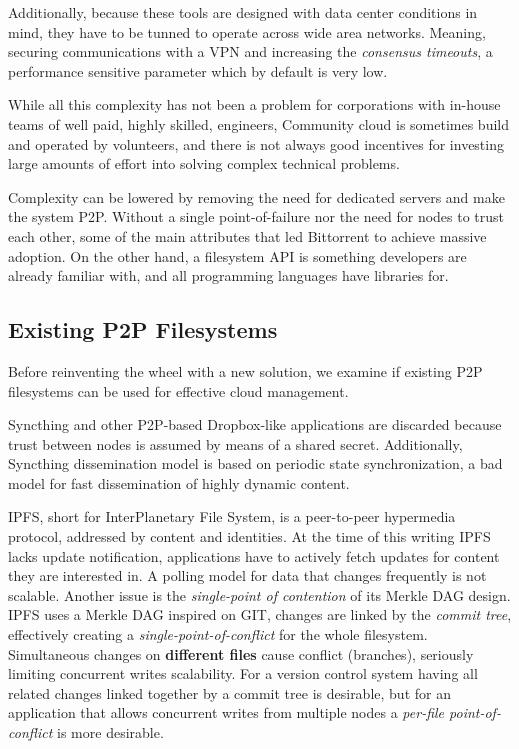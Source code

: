 \documentclass{sig-alternate}
\begin{document}
Additionally, because these tools are designed with data center conditions in mind, they have to be tunned to operate across wide area networks. Meaning, securing communications with a VPN and increasing the \textit{consensus timeouts}, a performance sensitive parameter which by default is very low.

While all this complexity has not been a problem for corporations with in-house teams of well paid, highly skilled, engineers, Community cloud is sometimes build and operated by volunteers, and there is not always good incentives for investing large amounts of effort into solving complex technical problems.

Complexity can be lowered by removing the need for dedicated servers and make the system P2P. Without a single point-of-failure nor the need for nodes to trust each other, some of the main attributes that led Bittorrent to achieve massive adoption. On the other hand, a filesystem API is something developers are already familiar with, and all programming languages have libraries for.

\subsection{Existing P2P Filesystems}

Before reinventing the wheel with a new solution, we examine if existing P2P filesystems can be used for effective cloud management.

Syncthing and other P2P-based Dropbox-like applications are discarded because trust between nodes is assumed by means of a shared secret. Additionally, Syncthing dissemination model is based on periodic state synchronization, a bad model for fast dissemination of highly dynamic content.

IPFS, short for InterPlanetary File System, is a peer-to-peer hypermedia protocol, addressed by content and identities\cite{IPFS}. At the time of this writing IPFS lacks update notification, applications have to actively fetch updates for content they are interested in. A polling model for data that changes frequently is not scalable. Another issue is the \textit{single-point of contention} of its Merkle DAG design. IPFS uses a Merkle DAG inspired on GIT, changes are linked by the \textit{commit tree}, effectively creating a \textit{single-point-of-conflict} for the whole filesystem. Simultaneous changes on \textbf{different files} cause conflict (branches), seriously limiting concurrent writes scalability. For a version control system having all related changes linked together by a commit tree is desirable, but for an application that allows concurrent writes from multiple nodes a \textit{per-file point-of-conflict} is more desirable. 
\end{document}
